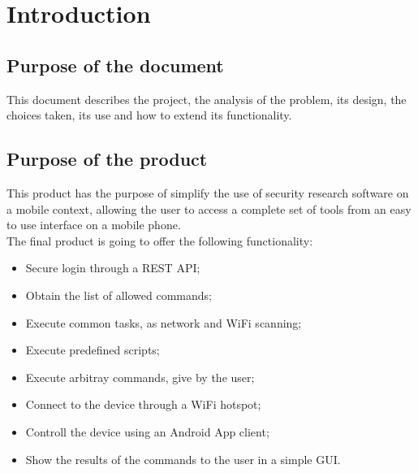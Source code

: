 \documentclass[../PiTest.tex]{subfiles}
\begin{document}
\section{Introduction}

	\subsection{Purpose of the document}
	This document describes the project, the analysis of the problem, its design, the choices taken, its use and how to extend its functionality.
	
	\subsection{Purpose of the product}
	This product has the purpose of simplify the use of security research software on a mobile context, allowing the user to access a complete set of tools from an easy to use interface on a mobile phone.\\
	The final product is going to offer the following functionality:
	\begin{itemize}
		\item Secure login through a REST API;
		\item Obtain the list of allowed commands;
		\item Execute common tasks, as network and WiFi scanning;
		\item Execute predefined scripts;
		\item Execute arbitray commands, give by the user;
		\item Connect to the device through a WiFi hotspot;
		\item Controll the device using an Android App client;
		\item Show the results of the commands to the user in a simple GUI.
	\end{itemize}
	
\end{document}
